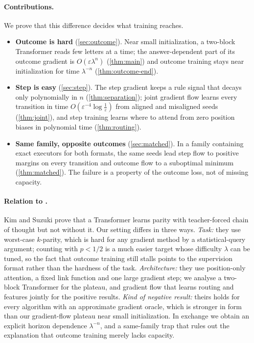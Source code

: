 \paragraph{Contributions.} We prove that this difference decides what training reaches.
\begin{itemize}[leftmargin=*,itemsep=2pt,topsep=2pt]
\item \textbf{Outcome is hard} (\cref{sec:outcome}). Near small initialization, a two-block Transformer
reads few letters at a time; the answer-dependent part of its outcome gradient is $O(\varepsilon\lambda^n)$ (\cref{thm:main}) and outcome
training stays near initialization for time $\lambda^{-n}$ (\cref{thm:outcome-end}).
\item \textbf{Step is easy} (\cref{sec:step}). The step gradient keeps a rule signal that decays
only polynomially in $n$ (\cref{thm:separation}); joint gradient flow learns every transition in time
$O(\varepsilon^{-4}\log\frac1\varepsilon)$ from aligned and misaligned seeds (\cref{thm:joint}), and step training learns where to attend
from zero position biases in polynomial time (\cref{thm:routing}).
\item \textbf{Same family, opposite outcomes} (\cref{sec:matched}). In a family containing exact
executors for both formats, the same seeds lead step flow to positive margins on every transition and outcome flow to
a suboptimal minimum (\cref{thm:matched}). The failure is a property of the outcome loss, not of
missing capacity.
\end{itemize}

\paragraph{Relation to \citet{kim2024parity}.} Kim and Suzuki prove that a Transformer learns parity with
teacher-forced chain of thought but not without it. Our setting differs in three ways. \emph{Task:} they
use worst-case $k$-parity, which is hard for any gradient method by a statistical-query argument;
counting with $p<1/2$ is a much easier target whose difficulty $\lambda$ can be tuned, so the fact that
outcome training still stalls points to the supervision format rather than the hardness of the task.
\emph{Architecture:} they use position-only attention, a fixed link function and one large gradient
step; we analyse a two-block Transformer for the plateau, and gradient flow that learns routing and
features jointly for the positive results. \emph{Kind of negative result:} theirs holds for every
algorithm with an approximate gradient oracle, which is stronger in form than our gradient-flow
plateau near small initialization. In exchange we obtain an explicit horizon dependence $\lambda^{-n}$,
and a same-family trap that rules out the explanation that outcome training merely lacks capacity.

